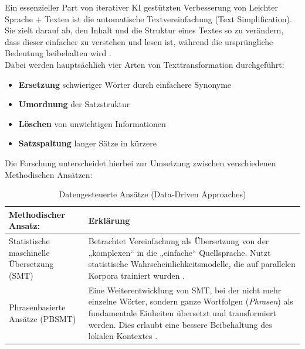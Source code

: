 
Ein essenzieller Part von iterativer KI gestützten Verbesserung von Leichter Sprache + Texten ist die automatische Textvereinfachung (Text Simplification). Sie zielt darauf ab, den Inhalt und die Struktur eines Textes so zu verändern, dass dieser einfacher zu verstehen und lesen ist, während die ursprüngliche Bedeutung beibehalten wird \cite[1. Introduction]{alva-manchego_data-driven_2020}. \\
Dabei werden hauptsächlich vier Arten von Texttransformation durchgeführt:
\begin{itemize}[label=\textbullet, nosep]
	\item \textbf{Ersetzung} schwieriger Wörter durch einfachere Synonyme
	\item \textbf{Umordnung} der Satzstruktur
	\item \textbf{Löschen} von unwichtigen Informationen
	\item \textbf{Satzspaltung} langer Sätze in kürzere
\end{itemize}

Die Forschung unterscheidet hierbei zur Umsetzung zwischen verschiedenen Methodischen Ansätzen:
\begin{table}[h!]
	\centering
	\begin{tabularx}{\textwidth}{|X|X|}
		\hline
		\textbf{Methodischer Ansatz:} & \textbf{Erklärung} \\
		\hline
		Statistische maschinelle Übersetzung (SMT) & Betrachtet Vereinfachung als Übersetzung von der „komplexen“ in die „einfache“ Quellsprache. Nutzt statistische Wahrscheinlichkeitsmodelle, die auf parallelen Korpora trainiert wurden \cite[S. 154]{alva-manchego_data-driven_2020}. \\
		\hline
		Phrasenbasierte Ansätze (PBSMT) & Eine Weiterentwicklung von SMT, bei der nicht mehr einzelne Wörter, sondern ganze Wortfolgen (\textit{Phrasen}) als fundamentale Einheiten übersetzt und transformiert werden. Dies erlaubt eine bessere Beibehaltung des lokalen Kontextes \cite[S. 154]{alva-manchego_data-driven_2020}. \\
		\hline
	\end{tabularx}
	\caption{Datengesteuerte Ansätze (Data-Driven Approaches)}
\end{table}